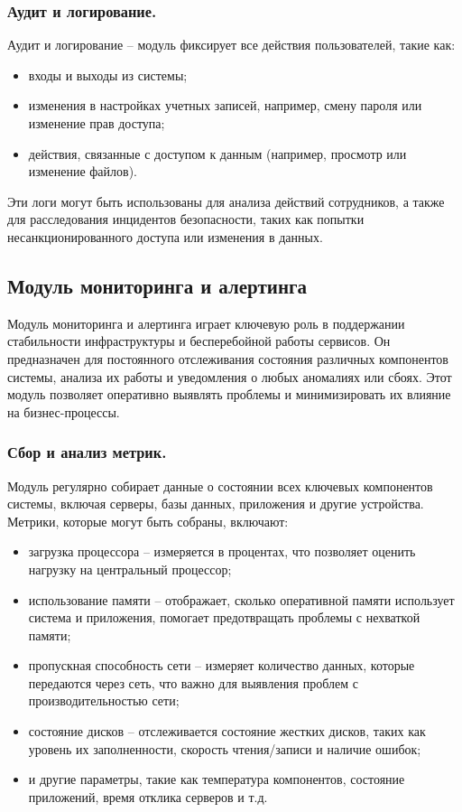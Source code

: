 \subsubsection{Аудит и логирование.} Аудит и логирование -- модуль фиксирует все действия пользователей, такие как:
\begin{itemize}
    \item входы и выходы из системы;
    \item изменения в настройках учетных записей, например, смену пароля или изменение прав доступа;
    \item действия, связанные с доступом к данным (например, просмотр или изменение файлов).
\end{itemize}

Эти логи могут быть использованы для анализа действий сотрудников, а также для расследования инцидентов безопасности, таких как попытки несанкционированного доступа или изменения в данных.


\subsection{Модуль мониторинга и алертинга}
\label{sec:monitoring_alerting_functionality}

Модуль мониторинга и алертинга играет ключевую роль в поддержании стабильности инфраструктуры и бесперебойной работы сервисов. Он предназначен для постоянного отслеживания состояния различных компонентов системы, анализа их работы и уведомления о любых аномалиях или сбоях. Этот модуль позволяет оперативно выявлять проблемы и минимизировать их влияние на бизнес-процессы.

\subsubsection{Сбор и анализ метрик.} Модуль регулярно собирает данные о состоянии всех ключевых компонентов системы, включая серверы, базы данных, приложения и другие устройства. Метрики, которые могут быть собраны, включают:
\begin{itemize}
    \item загрузка процессора -- измеряется в процентах, что позволяет оценить нагрузку на центральный процессор;
    \item использование памяти -- отображает, сколько оперативной памяти использует система и приложения, помогает предотвращать проблемы с нехваткой памяти;
    \item пропускная способность сети -- измеряет количество данных, которые передаются через сеть, что важно для выявления проблем с производительностью сети;
    \item состояние дисков -- отслеживается состояние жестких дисков, таких как уровень их заполненности, скорость чтения/записи и наличие ошибок;
    \item и другие параметры, такие как температура компонентов, состояние приложений, время отклика серверов и т.д.
\end{itemize}

